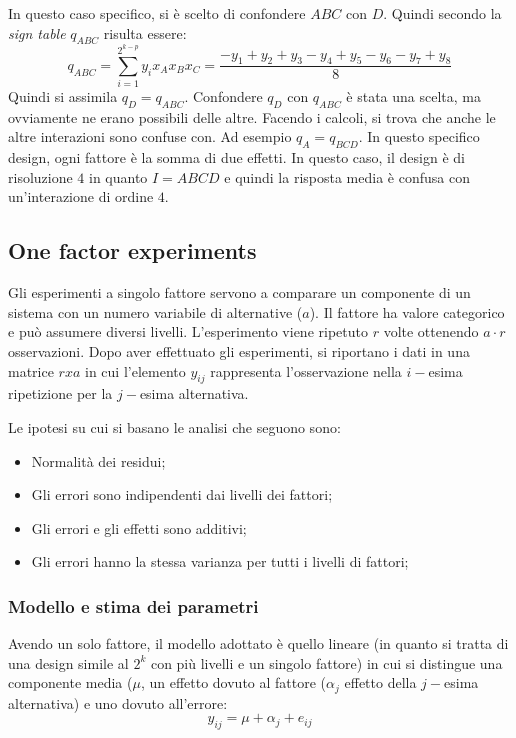 \documentclass{article}
\begin{document}
In questo caso specifico, si è scelto di confondere $ABC$ con $D$. Quindi secondo la 
\textit{sign table} $q_{ABC}$ risulta essere:
\[
  q_{ABC} = \sum_{i=1}^{2^{k-p}}y_ix_Ax_Bx_C =
  \frac{-y_1 + y_2 + y_3 -y_4 + y_5 -y_6 - y_7 +y_8}{8}
\]
Quindi si assimila $q_D = q_{ABC}$. Confondere $q_D$ con $q_{ABC}$ è stata una scelta, ma 
ovviamente ne erano possibili delle altre.  Facendo i calcoli, si trova che anche le altre 
interazioni sono confuse con. Ad esempio $q_A = q_{BCD}$. In questo specifico design, ogni
fattore è la somma di due effetti. In questo caso, il design è di risoluzione $4$ in quanto
$I = ABCD$ e quindi la risposta media è confusa con un'interazione di ordine $4$.


\subsection{One factor experiments}
Gli esperimenti a singolo fattore servono a comparare un componente di un sistema con un 
numero variabile di alternative ($a$). Il fattore ha valore categorico e può assumere diversi 
livelli. L'esperimento viene ripetuto $r$ volte ottenendo $a\cdot r$ osservazioni. Dopo aver
effettuato gli esperimenti, si riportano i dati in una matrice $r x a$ in cui l'elemento 
$y_{ij}$ rappresenta l'osservazione nella $i-$esima ripetizione per la $j-$esima alternativa. 

Le ipotesi su cui si basano le analisi che seguono sono:
\begin{itemize}
  \item Normalità dei residui;
  \item Gli errori sono indipendenti dai livelli dei fattori;
  \item Gli errori e gli effetti sono additivi;
  \item Gli errori hanno la stessa varianza per tutti i livelli di fattori;
\end{itemize}

\subsubsection{Modello e stima dei parametri}
Avendo un solo fattore, il modello adottato è quello lineare (in quanto si tratta di una 
design simile al $2^k$ con più livelli e un singolo fattore) in cui si distingue una 
componente media ($\mu$, un effetto dovuto al fattore ($\alpha_j$ effetto della $j-$esima
alternativa) e uno dovuto all'errore:
\begin{equation}
  y_{ij} = \mu + \alpha_j + e_{ij}
  \label{eq:one-factor-model}
\end{equation}
\end{document}
